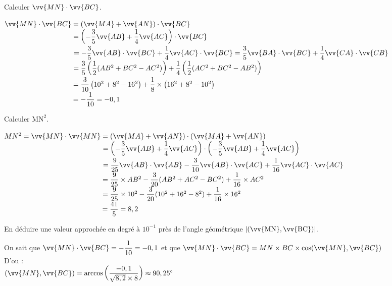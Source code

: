 \documentclass[11pt,a4paper]{article}  %
\begin{document}
\begin{enumMet}
	\item Calculer $\vv{MN} \cdot \vv{BC}$.
	\begin{corrBox}
		$\vv{MN} \cdot \vv{BC}=\left(\vv{MA}+\vv{AN}\right)\cdot\vv{BC}$\\
		$\phantom{\vv{MN} \cdot \vv{BC}}=\left(-\dfrac{3}{5}\vv{AB}+\dfrac{1}{4}\vv{AC}\right)\cdot\vv{BC}$\\
		$\phantom{\vv{MN} \cdot \vv{BC}}=-\dfrac{3}{5}\vv{AB}\cdot\vv{BC}+\dfrac{1}{4}\vv{AC}\cdot\vv{BC}=\dfrac{3}{5}\vv{BA}\cdot\vv{BC}+\dfrac{1}{4}\vv{CA}\cdot\vv{CB}$\\
		$\phantom{\vv{MN} \cdot \vv{BC}}=\dfrac{3}{5}\left(\dfrac{1}{2}(AB^2+BC^2-AC^2)\right)+\dfrac{1}{4}\left(\dfrac{1}{2}(AC^2+BC^2-AB^2)\right)$\\
		$\phantom{\vv{MN} \cdot \vv{BC}}=\dfrac{3}{10}\left(10^2+8^2-16^2\right)+\dfrac{1}{8}\times \left(16^2+8^2-10^2\right)$\\
		$\phantom{\vv{MN} \cdot \vv{BC}}=-\dfrac{1}{10}=-0,1$	
	\end{corrBox}
	\item Calculer $\mathrm{MN}^2$.
	\begin{corrBox}
		$MN^2=\vv{MN} \cdot \vv{MN}=\left(\vv{MA}+\vv{AN}\right)\cdot\left(\vv{MA}+\vv{AN}\right)$\\
		$\phantom{MN^2=\vv{MN} \cdot \vv{MN}}=\left(-\dfrac{3}{5}\vv{AB}+\dfrac{1}{4}\vv{AC}\right)\cdot\left(-\dfrac{3}{5}\vv{AB}+\dfrac{1}{4}\vv{AC}\right)$\\
		$\phantom{MN^2=\vv{MN} \cdot \vv{MN}}=\dfrac{9}{25}\vv{AB}\cdot\vv{A B}-\dfrac{3}{10}\vv{A B}\cdot\vv{AC}+\dfrac{1}{16}\vv{AC}\cdot\vv{AC}$\\
		$\phantom{MN^2=\vv{MN} \cdot \vv{MN}}=\dfrac{9}{25}\times AB^2-\dfrac{3}{20}(AB^2+AC^2-BC^2)+\dfrac{1}{16}\times AC^2$\\
		$\phantom{MN^2=\vv{MN} \cdot \vv{MN}}=\dfrac{9}{25}\times 10^2-\dfrac{3}{20}(10^2+16^2-8^2)+\dfrac{1}{16}\times 16^2$\\
		$\phantom{MN^2=\vv{MN} \cdot \vv{MN}}=\dfrac{41}{5}=8,2$
	\end{corrBox}
	\item En déduire une valeur approchée en degré à $10^{-1}$ près de l'angle géométrique $|(\vv{\mathrm{MN}}, \vv{\mathrm{BC}})|$.
	\begin{corrBox}
		On sait que $\vv{MN} \cdot \vv{BC}=-\dfrac{1}{10}=-0,1$ et que $\vv{MN} \cdot \vv{BC}=MN\times BC\times \cos(\vv{MN}, \vv{BC})$\\
		D'ou : \\
		$(\vv{MN}, \vv{BC})=\arccos\left(\dfrac{-0,1}{\sqrt{8,2}\times 8}\right)\approx90,25\degree$
	\end{corrBox}
\end{enumMet}
\end{document}
